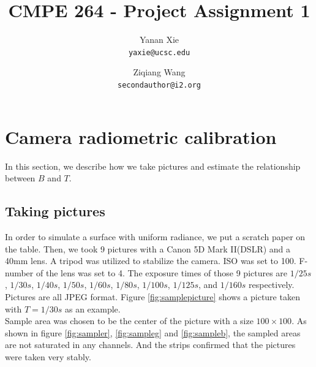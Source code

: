 \documentclass[10pt,twocolumn,letterpaper]{article}
\begin{document}
\title{CMPE 264 - Project Assignment 1}

\author{Yanan Xie\\
{\tt\small yaxie@ucsc.edu}
\and
Ziqiang Wang\\
{\tt\small secondauthor@i2.org}
}

\maketitle


\section{Camera radiometric calibration}
\label{sec:crc}

In this section, we describe how we take pictures and estimate the relationship between $B$ and $T$.

\subsection{Taking pictures}

In order to simulate a surface with uniform radiance, we put a scratch paper on the table. Then, we took 9 pictures with a Canon 5D Mark II(DSLR) and a 40mm lens. A tripod was utilized to stabilize the camera. ISO was set to 100. F-number of the lens was set to 4. The exposure times of those 9 pictures are $1/25s$, $1/30s$, $1/40s$, $1/50s$, $1/60s$, $1/80s$, $1/100s$, $1/125s$, and $1/160s$ respectively. Pictures are all JPEG format. Figure \ref{fig:samplepicture} shows a picture taken with $T = 1/30s$ as an example. \\

Sample area was chosen to be the center of the picture with a size $100\times 100$. As shown in figure \ref{fig:sampler}, \ref{fig:sampleg} and \ref{fig:sampleb}, the sampled areas are not saturated in any channels. And the strips confirmed that the pictures were taken very stably.
\end{document}
